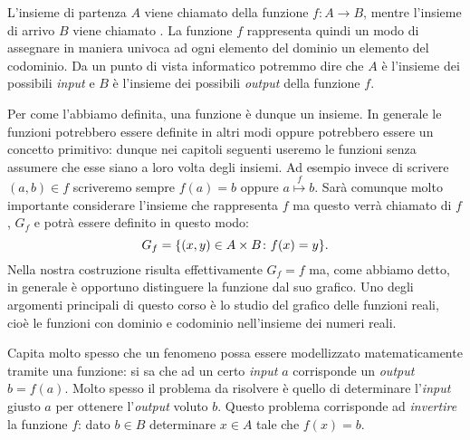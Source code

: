 L'insieme di partenza $A$ viene chiamato  
della funzione $f\colon A\to B$,
mentre l'insieme di arrivo $B$ viene chiamato .
La funzione $f$ rappresenta quindi un modo di assegnare in maniera univoca
ad ogni elemento del dominio un elemento del codominio.
Da un punto di vista informatico potremmo dire che $A$ è l'insieme
dei possibili \emph{input} e $B$ è l'insieme dei possibili \emph{output}
della funzione $f$.

Per come l'abbiamo definita, una funzione è dunque un insieme.
In generale le funzioni potrebbero essere definite in altri modi oppure 
potrebbero essere un concetto primitivo: dunque nei capitoli seguenti useremo le funzioni 
senza assumere che esse siano a loro volta degli insiemi.
Ad esempio invece di scrivere $(a,b)\in f$ scriveremo sempre $f(a)=b$ 
oppure $a\stackrel f \mapsto b$.
Sarà comunque molto importante
considerare l'insieme che rappresenta $f$ ma questo verrà chiamato
 di $f$, $G_f$ e potrà essere definito in questo modo:
\[
  G_f = {\left\{ (x,y)\in A \times B\colon f(x)=y \right\}}.
\]
Nella nostra costruzione risulta effettivamente $G_f = f$ ma, come abbiamo detto,
in generale è opportuno distinguere la funzione dal suo grafico.
Uno degli argomenti principali di questo corso è lo studio 
del grafico delle funzioni reali, cioè le funzioni 
con dominio e codominio nell'insieme dei numeri reali.

Capita molto spesso che un fenomeno possa essere modellizzato matematicamente
tramite una funzione: si sa che ad un certo \emph{input} $a$ corrisponde
un \emph{output} $b=f(a)$. Molto spesso il problema da risolvere è
quello di determinare l'\emph{input} giusto $a$ per ottenere l'\emph{output}
voluto $b$. Questo problema corrisponde ad \emph{invertire} la funzione $f$:
dato $b\in B$ determinare $x\in A$ tale che $f(x) = b$.

